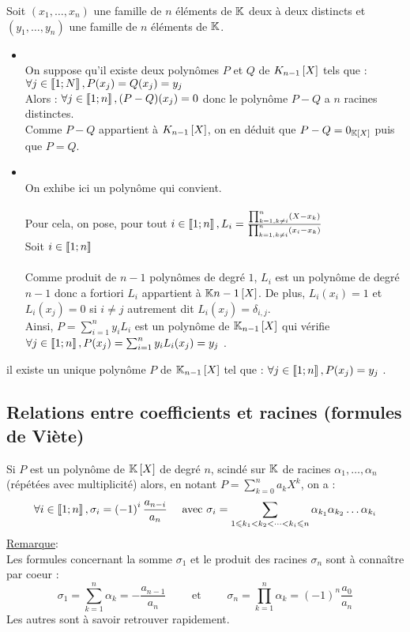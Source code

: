 \begin{dem}
Soit \((x_1, \dots , x_n)\) une famille de \(n\) éléments de \(\mathbb{K}\) deux à deux distincts et \((y_1, \dots , y_n)\) une famille de \(n\) éléments de \(\mathbb{K}\).
\begin{itemize}
    \item \unicite \\
    On suppose qu’il existe deux polynômes \(P\) et \(Q\) de \(K_{n-1} \left[X\right]\) tels que :\( \forall j \in \left\llbracket1;N\right\rrbracket , P (x_j ) = Q(x_j ) = y_j \)\\
    Alors : \(\forall j \in \left\llbracket1;n\right\rrbracket , (P - Q)(x_j ) = 0\) donc le polynôme \(P - Q\) a \(n\) racines distinctes.\\
    Comme \(P - Q\) appartient à \(K_{n-1} \left[X\right]\), on en déduit que \(P - Q = 0_{\mathbb{K}\left[X\right]}\) puis que \(P = Q\).
    \item \existence \\
    On exhibe ici un polynôme qui convient.\\~\\
    Pour cela, on pose, pour tout \(i \in \left\llbracket1;n\right\rrbracket,L_i = \frac{\prod_{k=1,k \neq i}^{n}\left(X - x_k\right)}{\prod_{k=1,k \neq i}^{n}\left(x_i - x_k\right)} \) \\
    Soit \(i \in \left\llbracket1;n\right\rrbracket\)\\~\\
    Comme produit de \(n - 1\) polynômes de degré \(1\), \(L_i\) est un polynôme de degré \(n - 1\) donc a fortiori \(L_i\) appartient à \(\mathbb{K}{n-1} \left[X\right]\). De plus, \(L_i(x_i) = 1\) et \(L_i(x_j ) = 0\) si \(i\neq j\) autrement dit \(L_i(x_j ) = \delta_{i,j} \).\\
    Ainsi, \(P = \sum^n _{i=1} y_iL_i\) est un polynôme de \(\mathbb{K}_{n-1} \left[X\right]\) qui vérifie \(\forall j \in \left\llbracket1;n\right\rrbracket, P (x_j ) = \sum^n _{i=1} y_iL_i(x_j ) = y_j\) .
\end{itemize}
\conclusion il existe un unique polynôme \(P\) de \(\mathbb{K}_{n-1}\left[X\right]\) tel que : \(\forall j \in \left\llbracket1;n\right\rrbracket, P (x_j ) = y_j\) .
\end{dem}
\subsection{Relations entre coefficients et racines (formules de Viète)}
\begin{defprop}
    Si \(P\) est un polynôme de \(\mathbb{K} \left[X\right]\) de degré \(n\), scindé sur \(\mathbb{K}\) de racines \(\alpha_1, \dots , \alpha_n\) (répétées avec multiplicité) alors, en notant \(P = \sum_{k=0}^{n}a_k X^k\), on a :
    \[\forall i \in \left\llbracket1;n\right\rrbracket, \sigma_i = \left(-1\right)^i \frac{a_{n-i}}{a_n} \quad \text{ avec } \sigma_i = \sum_{1 \leqslant k_1 < k_2 <\dots< k_i \leqslant n} \alpha_{k_1} \alpha_{k_2} \dots \alpha_{k_i}\]
    \underline{Remarque}: \\
    Les formules concernant la somme \(\sigma_1\) et le produit des racines \(\sigma_n\) sont à connaître par coeur :
    \[\sigma_1 = \sum_{k=1}^n \alpha_k = - \frac{a_{n-1}}{a_n} \qquad \text{ et } \qquad \sigma_n = \prod_{k=1}^{n} \alpha_k = (-1)^n \frac{a_0}{a_n}\]
    Les autres sont à savoir retrouver rapidement.
\end{defprop}

